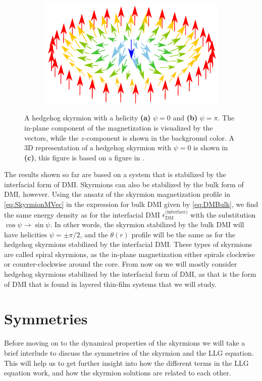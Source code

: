 \begin{figure}[h!]
\begin{subfigure}{.49\textwidth}
  \includegraphics[width=\linewidth]{Figures/HedgehogSkyrmion}
  \caption{}
  \label{fig:HedgehogSkyrmion3}
\end{subfigure}
\caption{A hedgehog skyrmion with a helicity \textbf{(a)} $\psi = 0$ and \textbf{(b)} $\psi = \pi$. The in-plane component of the magnetization is visualized by the vectors, while the $z$-component is shown in the background color. A 3D representation of a hedgehog skyrmion with $\psi = 0$ is shown in \textbf{(c)}, this figure is based on a figure in \cite{EverschorDissertation}.}
\label{fig:HedgehogSkyrmions}
\end{figure}

The results shown so far are based on a system that is stabilized by the interfacial form of DMI. Skyrmions can also be stabilized by the bulk form of DMI, however. Using the ansatz of the skyrmion magnetization profile in \eqref{eq:SkyrmionMVec} in the expression for bulk DMI given by \eqref{eq:DMBulk}, we find the same energy density as for the interfacial DMI $\epsilon_{\text{DM}}^{\textrm{(interface)}}$ with the substitution $\cos\psi \rightarrow \sin\psi$. In other words, the skyrmion stabilized by the bulk DMI will have helicities $\psi=\pm\pi/2$, and the $\theta(r)$ profile will be the same as for the hedgehog skyrmions stabilized by the interfacial DMI. These types of skyrmions are called spiral skyrmions, as the in-plane magnetization either spirals clockwise or counter-clockwise around the core. From now on we will mostly consider hedgehog skyrmions stabilized by the interfacial form of DMI, as that is the form of DMI that is found in layered thin-film systems that we will study.

\section{Symmetries}
Before moving on to the dynamical properties of the skyrmions we will take a brief interlude to discuss the symmetries of the skyrmion and the LLG equation. This will help us to get further insight into how the different terms in the LLG equation work, and how the skyrmion solutions are related to each other.

